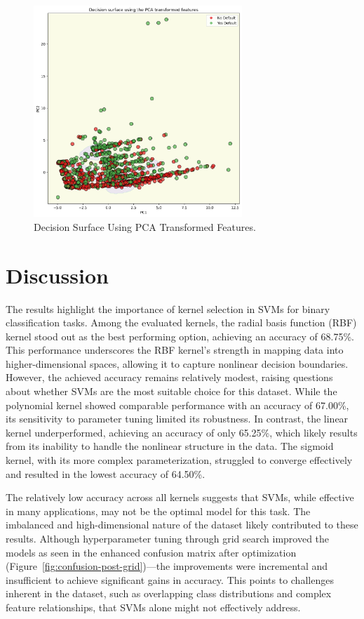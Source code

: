 \documentclass{article}
\begin{document}
\begin{figure}[H]
    \centering
    \includegraphics[width=0.7\textwidth]{../figures/decision_surface_pca.png}
    \caption{Decision Surface Using PCA Transformed Features.}
    \label{fig:decision-surface}
\end{figure}

\section{Discussion}

The results highlight the importance of kernel selection in SVMs for binary classification tasks. Among the evaluated kernels, the radial basis function (RBF) kernel stood out as the 
best performing option, achieving an accuracy of 68.75\%. This performance underscores the RBF kernel's strength in mapping data into higher-dimensional spaces, allowing it to capture nonlinear decision boundaries. 
However, the achieved accuracy remains relatively modest, raising questions about whether SVMs are the most suitable choice for this dataset. While the polynomial kernel showed comparable performance with an accuracy of 67.00\%, 
its sensitivity to parameter tuning limited its robustness. In contrast, the linear kernel underperformed, achieving an accuracy of only 65.25\%, which likely results from its inability to handle the nonlinear structure in the data. 
The sigmoid kernel, with its more complex parameterization, struggled to converge effectively and resulted in the lowest accuracy of 64.50\%.

The relatively low accuracy across all kernels suggests that SVMs, while effective in many applications, may not be the optimal model for this task. The imbalanced and high-dimensional nature of the dataset likely contributed to these results. 
Although hyperparameter tuning through grid search improved the models as seen in the enhanced confusion matrix after optimization (Figure~\ref{fig:confusion-post-grid})—the improvements were incremental and insufficient to achieve significant gains in accuracy. 
This points to challenges inherent in the dataset, such as overlapping class distributions and complex feature relationships, that SVMs alone might not effectively address.
\end{document}
